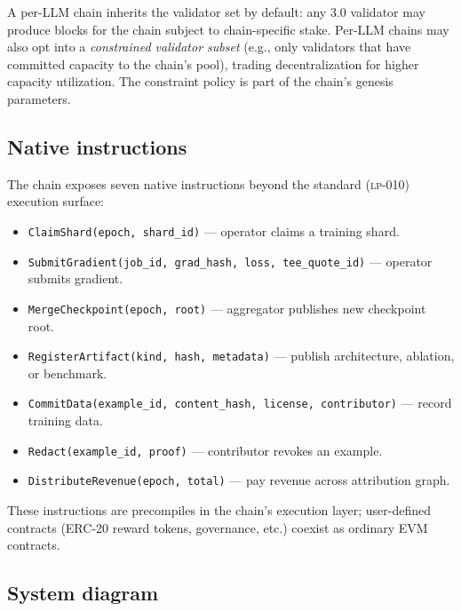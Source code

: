 A per-LLM chain inherits the \Quasar{} validator set by default: any \Quasar{} 3.0 validator may produce blocks for the chain subject to chain-specific stake. Per-LLM chains may also opt into a \emph{constrained validator subset} (e.g., only validators that have committed \GPU{} capacity to the chain's pool), trading decentralization for higher capacity utilization. The constraint policy is part of the chain's genesis parameters.

\subsection{Native instructions}

The chain exposes seven native instructions beyond the standard \BlockSTM{} (\textsc{lp-010}) execution surface:
\begin{itemize}[nosep]
\item \texttt{ClaimShard(epoch, shard\_id)} --- operator claims a training shard.
\item \texttt{SubmitGradient(job\_id, grad\_hash, loss, tee\_quote\_id)} --- operator submits gradient.
\item \texttt{MergeCheckpoint(epoch, root)} --- aggregator publishes new checkpoint root.
\item \texttt{RegisterArtifact(kind, hash, metadata)} --- publish architecture, ablation, or benchmark.
\item \texttt{CommitData(example\_id, content\_hash, license, contributor)} --- record training data.
\item \texttt{Redact(example\_id, proof)} --- contributor revokes an example.
\item \texttt{DistributeRevenue(epoch, total)} --- pay revenue across attribution graph.
\end{itemize}

These instructions are precompiles in the chain's execution layer; user-defined contracts (ERC-20 reward tokens, governance, etc.) coexist as ordinary EVM contracts.

\subsection{System diagram}

